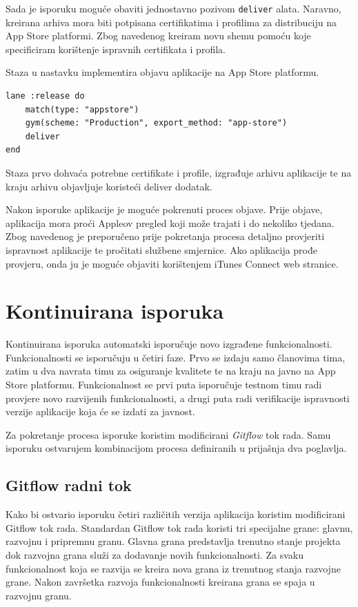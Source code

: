 \documentclass[times, utf8, diplomski, numeric]{fer}
\begin{document}
\begin{appendices}
Sada je isporuku moguće obaviti jednostavno pozivom \verb|deliver| alata. Naravno, kreirana arhiva mora biti potpisana certifikatima i profilima za distribuciju na App Store platformi. Zbog navedenog kreiram novu shemu pomoću koje specificiram korištenje ispravnih certifikata i profila.

Staza u nastavku implementira objavu aplikacije na App Store platformu.

\begin{lstlisting}[caption=Isporuka na App Store platformu korištenjem dodatka deliver]
lane :release do
    match(type: "appstore")
    gym(scheme: "Production", export_method: "app-store")
    deliver
end
\end{lstlisting}

Staza prvo dohvaća potrebne certifikate i profile, izgrađuje arhivu aplikacije te na kraju arhivu objavljuje koristeći deliver dodatak.

Nakon isporuke aplikacije je moguće pokrenuti proces objave. Prije objave, aplikacija mora proći Appleov pregled koji može trajati i do nekoliko tjedana. Zbog navedenog je preporučeno prije pokretanja procesa detaljno provjeriti ispravnost aplikacije te pročitati službene smjernice. Ako aplikacija prođe provjeru, onda ju je moguće objaviti korištenjem iTunes Connect web stranice.

\section{Kontinuirana isporuka}

Kontinuirana isporuka automatski isporučuje novo izgrađene funkcionalnosti. Funkcionalnosti se isporučuju u četiri faze. Prvo se izdaju samo članovima tima, zatim u dva navrata timu za osiguranje kvalitete te na kraju na javno na App Store platformu. Funkcionalnost se prvi puta isporučuje testnom timu radi provjere novo razvijenih funkcionalnosti, a drugi puta radi verifikacije ispravnosti verzije aplikacije koja će se izdati za javnost.

Za pokretanje procesa isporuke koristim modificirani \textit{Gitflow} tok rada. Samu isporuku ostvarujem kombinacijom procesa definiranih u prijašnja dva poglavlja.

\subsection{Gitflow radni tok}

Kako bi ostvario isporuku četiri različitih verzija aplikacija koristim modificirani Gitflow tok rada. Standardan Gitflow tok rada koristi tri specijalne grane: glavnu, razvojnu i pripremnu granu. Glavna grana predstavlja trenutno stanje projekta dok razvojna grana služi za dodavanje novih funkcionalnosti. Za svaku funkcionalnost koja se razvija se kreira nova grana iz trenutnog stanja razvojne grane. Nakon završetka razvoja funkcionalnosti kreirana grana se spaja u razvojnu granu.


\end{appendices}
\end{document}
